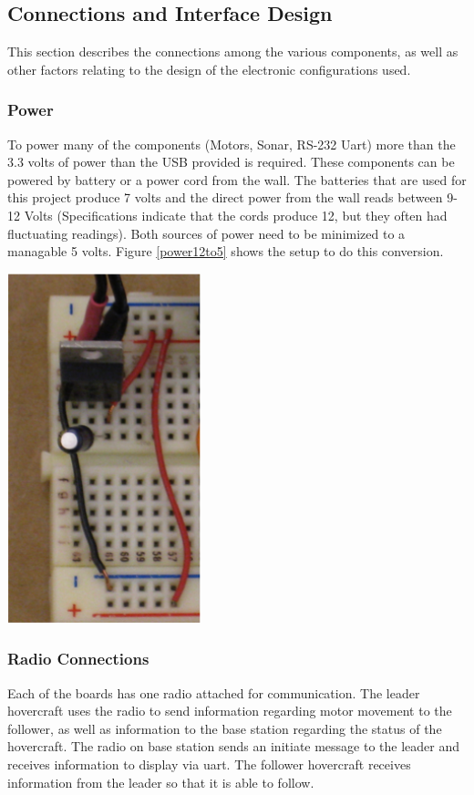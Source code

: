 \subsection{Connections and Interface Design}
This section describes the connections among the various components, as well as other factors relating to the design of the electronic configurations used.  

\subsubsection{Power}
To power many of the components (Motors, Sonar, RS-232 Uart)  more than the 3.3 volts of power than the USB provided is required. These components can be powered by battery or a power cord from the wall. The batteries that are used for this project produce 7 volts and the direct power from the wall reads between 9-12 Volts (Specifications indicate that the cords produce 12, but they often had fluctuating readings).  Both sources of power need to be minimized to a managable 5 volts.  Figure \ref{power12to5} shows the setup to do this conversion.

\begin{minipage}{6.5in}
  \centering
    \includegraphics[height = 4in]{imageSources/power12to5.png}
  
  \label{power12to5}
\end{minipage}

\subsubsection{Radio Connections}
\label{subsec:radioconn}
 Each of the boards has one radio attached for communication. The leader hovercraft uses the radio to send information regarding motor movement to the follower, as well as information to the base station regarding the status of the hovercraft.  The radio on base station sends an initiate message to the leader and receives information to display via uart. The follower hovercraft receives information from the leader so that it is able to follow.

